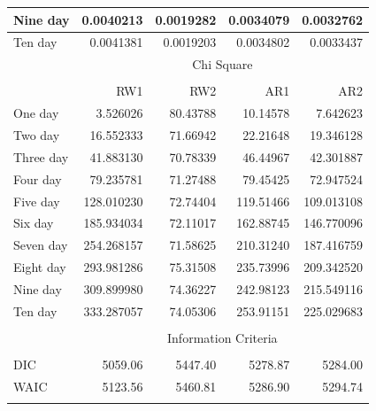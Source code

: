 \documentclass[10pt,letterpaper]{article}
\begin{document}
\begin{table}[!h]
\begin{tabular}[t]{lrrrr}
	\hline
	Nine day & 0.0040213 & 0.0019282 & 0.0034079 & 0.0032762\\
	\hline
	Ten day & 0.0041381 & 0.0019203 & 0.0034802 & 0.0033437\\
	\hline
	& \multicolumn{4}{c}{Chi Square}\\
	\cline{2-5}\\
	& RW1 & RW2 & AR1 & AR2\\
	\hline
	One day & 3.526026 & 80.43788 & 10.14578 & 7.642623\\
	\hline
	Two day & 16.552333 & 71.66942 & 22.21648 & 19.346128\\
	\hline
	Three day & 41.883130 & 70.78339 & 46.44967 & 42.301887\\
	\hline
	Four day & 79.235781 & 71.27488 & 79.45425 & 72.947524\\
	\hline
	Five day & 128.010230 & 72.74404 & 119.51466 & 109.013108\\
	\hline
	Six day & 185.934034 & 72.11017 & 162.88745 & 146.770096\\
	\hline
	Seven day & 254.268157 & 71.58625 & 210.31240 & 187.416759\\
	\hline
	Eight day & 293.981286 & 75.31508 & 235.73996 & 209.342520\\
	\hline
	Nine day & 309.899980 & 74.36227 & 242.98123 & 215.549116\\
	\hline
	Ten day & 333.287057 & 74.05306 & 253.91151 & 225.029683\\
	\hline
		\hline\\
		& \multicolumn{4}{c}{Information Criteria}\\
		\hline\\
		DIC & 5059.06 & 5447.40 & 5278.87 & 5284.00\\
		WAIC & 5123.56 & 5460.81 & 5286.90 & 5294.74\\
		\hline\\
	\end{tabular}
\end{table}
\end{document}
